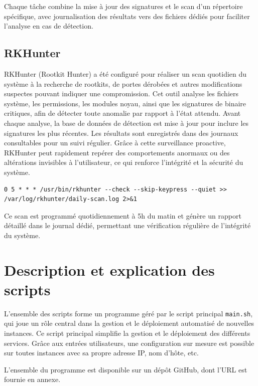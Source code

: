 \documentclass[a4paper,12pt]{article}
\begin{document}
Chaque tâche combine la mise à jour des signatures et le scan d'un répertoire spécifique, avec journalisation des résultats vers des fichiers dédiés pour faciliter l'analyse en cas de détection.

\subsection{RKHunter}

RKHunter (Rootkit Hunter) a été configuré pour réaliser un scan quotidien du système à la recherche de rootkits, de portes dérobées et autres modifications suspectes pouvant indiquer une compromission. Cet outil analyse les fichiers système, les permissions, les modules noyau, ainsi que les signatures de binaire critiques, afin de détecter toute anomalie par rapport à l'état attendu. Avant chaque analyse, la base de données de détection est mise à jour pour inclure les signatures les plus récentes. Les résultats sont enregistrés dans des journaux consultables pour un suivi régulier. Grâce à cette surveillance proactive, RKHunter peut rapidement repérer des comportements anormaux ou des altérations invisibles à l'utilisateur, ce qui renforce l'intégrité et la sécurité du système.

\begin{lstlisting}[caption={Configuration RKHunter – /etc/crontab}]
0 5 * * * /usr/bin/rkhunter --check --skip-keypress --quiet >> /var/log/rkhunter/daily-scan.log 2>&1
\end{lstlisting}

Ce scan est programmé quotidiennement à 5h du matin et génère un rapport détaillé dans le journal dédié, permettant une vérification régulière de l'intégrité du système.

\section{Description et explication des scripts}

L'ensemble des scripts forme un programme géré par le script principal \texttt{main.sh}, qui joue un rôle central dans la gestion et le déploiement automatisé de nouvelles instances. Ce script principal simplifie la gestion et le déploiement des différents services.
Grâce aux entrées utilisateurs, une configuration sur mesure est possible sur toutes instances avec sa propre adresse IP, nom d'hôte, etc.

L'ensemble du programme est disponible sur un dépôt GitHub, dont l'URL est fournie en annexe.
\end{document}
